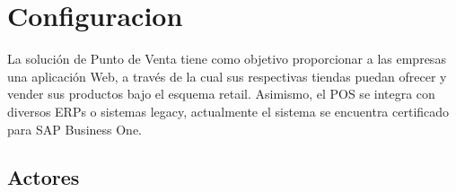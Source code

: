 \documentclass[pdftex,12pt,oneside,a4paper,spanish, english, brazil]{abntex2}
\begin{document}
      \begin{sloppypar}
          
            
            \frenchspacing
          
          \pretextual

            
            \cleardoublepage
          



            \vspace{1cm}
           
          \textual
          
          
            \chapter{Configuracion}
            La solución de Punto de Venta tiene como objetivo proporcionar a las empresas una aplicación Web, a través de la cual sus respectivas tiendas puedan ofrecer y vender sus productos bajo el esquema retail.
            Asimismo, el POS se integra con diversos ERPs o sistemas legacy, actualmente el sistema se encuentra certificado para SAP Business One.
            
            
            \section{Actores}
            

\end{sloppypar}
\end{document}
